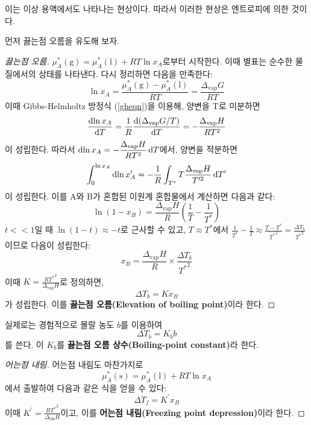         이는 이상 용액에서도 나타나는 현상이다. 따라서 이러한 현상은 엔트로피에 의한 것이다.
        \par 먼저 끓는점 오름을 유도해 보자.
        \begin{proof}[끓는점 오름]
        $\mu_A^\ast\left(\mathrm{g}\right)=\mu_A^\ast\left(\mathrm{l}\right)+RT\ln{x_A}$로부터 시작한다. 이때 
        별표는 순수한 물질에서의 상태를 나타낸다. 다시 정리하면 다음을 만족한다:
        $$
        \ln{x_A}=\frac{\mu_A^\ast\left(\mathrm{g}\right)-\mu_A^\ast\left(\mathrm{l}\right)}{RT}=\frac{\Delta_\mathrm{vap}G}{RT}
        $$
        이때 Gibbs-Helmholtz 방정식 (\ref{gheqn})을 이용해, 양변을 T로 미분하면
        $$
        \frac{\operatorname{d\!} \ln{x_A}}{\operatorname{d\!} T}=\frac{1}{R} \frac{\operatorname{d\!} \left(\Delta_\mathrm{vap}G/T\right)}{\operatorname{d\!} T}=-\frac{\Delta_\mathrm{vap}H}{RT^2}
        $$
        이 성립한다. 따라서 $\displaystyle\operatorname{d\!} \ln{x_A}=-\frac{\Delta_\mathrm{vap}H}{RT^2}\operatorname{d\!} T$에서, 
        양변을 적분하면 
        $$
        \int_{0}^{\ln{x_A}}\operatorname{d\!} \ln{x_A^\prime}=-\frac{1}{R}\int_{T^\ast}{T}\frac{\Delta_\mathrm{vap}H}{T^{\prime 2}}\operatorname{d\!} T^\prime
        $$
        이 성립한다. 이를 A와 B가 혼합된 이원계 혼합물에서 계산하면 다음과 같다:
        $$
        \ln{\left(1-x_B\right)}=\frac{\Delta_\mathrm{vap}H}{R}\left(\frac{1}{T}-\frac{1}{T^\ast}\right)
        $$
        $t <\!< 1$일 때 $\ln{\left(1-t\right)}\approx -t$로 근사할 수 있고, $T\approx T^\ast$에서 $\displaystyle\frac{1}{T^\ast}-\frac{1}{T}\approx \frac{T-T^\ast}{{T^\ast}^2} = \frac{\Delta T_b}{{T^\ast}^2}$이므로 
        다음이 성립한다:
        \begin{equation*}
            x_B = \frac{\Delta_\mathrm{vap}H}{R}\times\frac{\Delta T_b}{{T^\ast}^2}
        \end{equation*}
        이때 $K = \frac{R{T^\ast}^2}{\Delta_\mathrm{vap}H}$로 정의하면,
        \begin{equation*}
            \Delta T_b = K x_B
        \end{equation*}
        가 성립한다. 이를 \textbf{끓는점 오름(Elevation of boiling point)}이라 한다.
        \end{proof}
        \par 실제로는 경험적으로 몰랄 농도 $b$를 이용하여
        \begin{equation*}
            \Delta T_b = K_b b
        \end{equation*}
        를 쓴다. 이 $K_b$를 \textbf{끓는점 오름 상수(Boiling-point constant)}라 한다.
        \begin{proof}[어는점 내림]
        어는점 내림도 마찬가지로
        $$
        \mu_A^\ast\left(\mathrm{s}\right)=\mu_A^\ast\left(\mathrm{l}\right)+RT\ln{x_A}
        $$
        에서 출발하여 다음과 같은 식을 얻을 수 있다:
        \begin{equation*}
            \Delta T_f = K^\prime x_B
        \end{equation*}
        이때 $\displaystyle K^\prime = \frac{R{T^\ast}^2}{\Delta_\mathrm{fus}H}$이고, 이를 \textbf{어는점 내림(Freezing point depression)}이라 한다.
        \end{proof}
